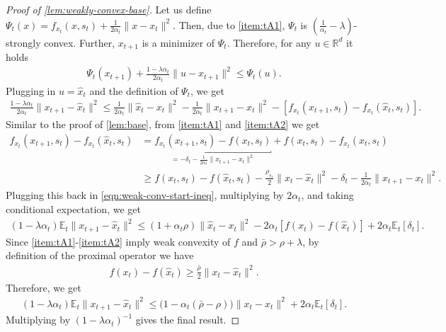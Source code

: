 \documentclass{article}
\newcommand{\R}{\mathbb{R}}
\newcommand{\E}{\mathbb{E}}
\theoremstyle{plain}
\theoremstyle{definition}
\theoremstyle{remark}
\begin{document}
\begin{proof}[Proof of \cref{lem:weakly-convex-base}]
    Let us define $\Psi_t(x) = f_{x_t}(x,s_t) + \frac{1}{2\alpha_t}\|x-x_t\|^2$. Then, due to \ref{item:tA1}, $\Psi_t$ is $(\frac{1}{\alpha_t} - \lambda)$-strongly convex. Further, $x_{t+1}$ is a minimizer of $\Psi_t$. Therefore, for any $u\in \R^d$ it holds
    \begin{align*}
        \Psi_t(x_{t+1}) + \frac{1-\lambda\alpha_t}{2\alpha_t}\|u-x_{t+1}\|^2 \leq \Psi_t(u).
    \end{align*}
    Plugging in $u=\hat{x}_t$ and the definition of $\Psi_t$, we get
    \begin{align}\label{eqn:weak-conv-start-ineq}
        \frac{1-\lambda\alpha_t}{2\alpha_t}\|x_{t+1} - \hat{x}_t\|^2 \leq
        \frac{1}{2\alpha_t}\|\hat{x}_t - x_t\|^2 - \frac{1}{2\alpha_t}\|x_{t+1} - x_t\|^2 - [f_{x_t}(x_{t+1},s_t) - f_{x_t}(\hat{x}_t,s_t)].
    \end{align}
    Similar to the proof of \cref{lem:base}, from \ref{item:tA1} and \ref{item:tA2} we get
    \begin{align*}
        f_{x_t}(x_{t+1},s_t) - f_{x_t}(\hat{x}_t,s_t) &= 
        \underbracket{f_{x_t}(x_{t+1},s_t) - f(x_t,s_t)}_{= -\delta_t - \frac{1}{2\alpha_t}\|x_{t+1}-x_t\|^2} + f(x_{t},s_t) - f_{x_t}(\hat{x}_t,s_t) \\
        &\geq
        f(x_t,s_t) - f(\hat{x}_t, s_t) - \frac{\rho_{s_t}}{2}\|x_t-\hat{x}_t\|^2
        -\delta_t - \frac{1}{2\alpha_t}\|x_{t+1}-x_t\|^2.
    \end{align*}
    Plugging this back in \eqref{eqn:weak-conv-start-ineq},  multiplying by $2\alpha_t$, and taking conditional expectation, we get
    \begin{align*}
        (1-\lambda\alpha_t)\E_t\|x_{t+1} - \hat{x}_t\|^2 \leq
        (1+\alpha_t\rho)\|\hat{x}_t - x_t\|^2  - 2\alpha_t[f(x_{t}) - f(\hat{x}_t)] + 2\alpha_t \E_t[\delta_t].
    \end{align*}
    Since \ref{item:tA1}-\ref{item:tA2} imply weak convexity of $f$ and $\bar{\rho} > \rho+\lambda$, by definition of the proximal operator we have
    \begin{align*}
         f(x_t) - f(\hat{x}_t) \geq \frac{\bar{\rho}}{2}\|x_t-\hat{x}_t\|^2.
    \end{align*}
    Therefore, we get
    \begin{align*}
        (1-\lambda\alpha_t)\E_t\|x_{t+1} - \hat{x}_t\|^2 \leq
        \big(1 - \alpha_t(\bar{\rho}-\rho)\big)\|x_t - \hat{x}_t\|^2
        + 2\alpha_t \E_t[\delta_t].
    \end{align*}
    Multiplying by $(1-\lambda\alpha_t)^{-1}$ gives the final result.
\end{proof}
%
\end{document}
